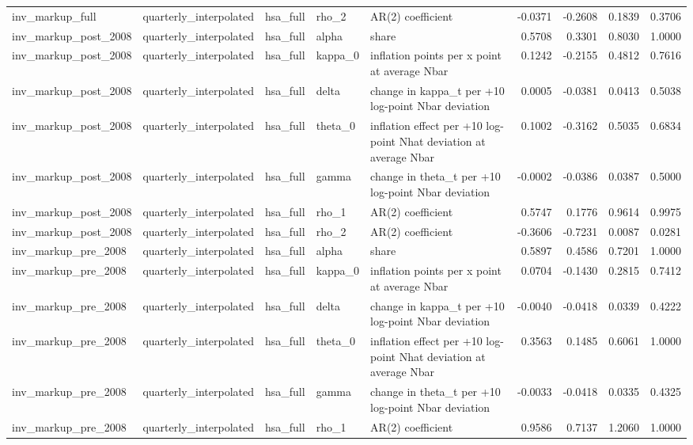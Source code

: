 \begin{tabular}{lllllrrrr}
inv\_markup\_full & quarterly\_interpolated & hsa\_full & rho\_2 & AR(2) coefficient & -0.0371 & -0.2608 & 0.1839 & 0.3706 \\
inv\_markup\_post\_2008 & quarterly\_interpolated & hsa\_full & alpha & share & 0.5708 & 0.3301 & 0.8030 & 1.0000 \\
inv\_markup\_post\_2008 & quarterly\_interpolated & hsa\_full & kappa\_0 & inflation points per x point at average Nbar & 0.1242 & -0.2155 & 0.4812 & 0.7616 \\
inv\_markup\_post\_2008 & quarterly\_interpolated & hsa\_full & delta & change in kappa\_t per +10 log-point Nbar deviation & 0.0005 & -0.0381 & 0.0413 & 0.5038 \\
inv\_markup\_post\_2008 & quarterly\_interpolated & hsa\_full & theta\_0 & inflation effect per +10 log-point Nhat deviation at average Nbar & 0.1002 & -0.3162 & 0.5035 & 0.6834 \\
inv\_markup\_post\_2008 & quarterly\_interpolated & hsa\_full & gamma & change in theta\_t per +10 log-point Nbar deviation & -0.0002 & -0.0386 & 0.0387 & 0.5000 \\
inv\_markup\_post\_2008 & quarterly\_interpolated & hsa\_full & rho\_1 & AR(2) coefficient & 0.5747 & 0.1776 & 0.9614 & 0.9975 \\
inv\_markup\_post\_2008 & quarterly\_interpolated & hsa\_full & rho\_2 & AR(2) coefficient & -0.3606 & -0.7231 & 0.0087 & 0.0281 \\
inv\_markup\_pre\_2008 & quarterly\_interpolated & hsa\_full & alpha & share & 0.5897 & 0.4586 & 0.7201 & 1.0000 \\
inv\_markup\_pre\_2008 & quarterly\_interpolated & hsa\_full & kappa\_0 & inflation points per x point at average Nbar & 0.0704 & -0.1430 & 0.2815 & 0.7412 \\
inv\_markup\_pre\_2008 & quarterly\_interpolated & hsa\_full & delta & change in kappa\_t per +10 log-point Nbar deviation & -0.0040 & -0.0418 & 0.0339 & 0.4222 \\
inv\_markup\_pre\_2008 & quarterly\_interpolated & hsa\_full & theta\_0 & inflation effect per +10 log-point Nhat deviation at average Nbar & 0.3563 & 0.1485 & 0.6061 & 1.0000 \\
inv\_markup\_pre\_2008 & quarterly\_interpolated & hsa\_full & gamma & change in theta\_t per +10 log-point Nbar deviation & -0.0033 & -0.0418 & 0.0335 & 0.4325 \\
inv\_markup\_pre\_2008 & quarterly\_interpolated & hsa\_full & rho\_1 & AR(2) coefficient & 0.9586 & 0.7137 & 1.2060 & 1.0000 \\

\end{tabular}
